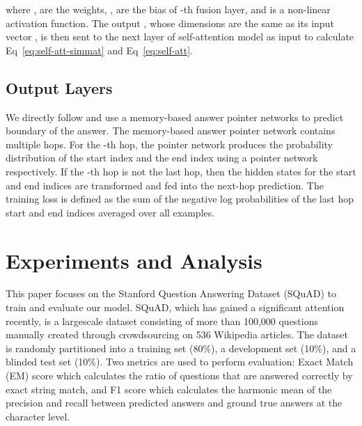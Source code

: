 \documentclass{article} \usepackage{arxiv, times}
\begin{document}
where 
,  are the weights, ,  are the bias of -th fusion layer, and  is a non-linear activation function. The output , whose dimensions are the same as its input vector , is then sent to the next layer of self-attention model as input to calculate Eq~\ref{eq:self-att-simmat} and Eq~\ref{eq:self-att}. 




\subsection{Output Layers}\label{subsection:output}
We directly follow \cite{hureinforced} and use a memory-based answer pointer networks to predict boundary of the answer. The memory-based answer pointer network contains multiple hops. For the -th hop, the pointer network produces the probability distribution of the start index  and the end index  using a pointer network \citep{vinyals2015pointer} respectively. If the -th hop is not the last hop, then the hidden states for the start and end indices are transformed and fed into the next-hop prediction. The training loss is defined as the sum of the negative log probabilities of the last hop start and end indices averaged over all examples.



 \section{Experiments and Analysis}
This paper focuses on the Stanford Question Answering Dataset (SQuAD) \citep{rajpurkar2016squad} to train and evaluate our model. 
SQuAD, which has gained a significant attention recently, is a largescale dataset consisting of more than 100,000 questions manually created through crowdsourcing on 536 Wikipedia articles. The dataset is randomly partitioned into a training set (80\%), a development set (10\%), and a blinded test set (10\%). Two metrics are used to perform evaluation: Exact Match (EM) score which calculates the ratio of questions that are answered correctly by exact string match, and F1 score which calculates the harmonic mean of the precision and recall between predicted answers and ground true answers at the character level. 
\end{document}
